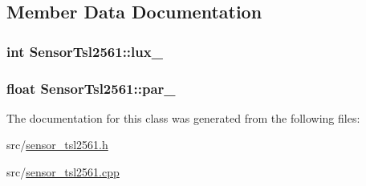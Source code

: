 \subsection{Member Data Documentation}
\hypertarget{class_sensor_tsl2561_ae12c0a6210834b63eb786e81043c38c4}{}
\subsubsection[{lux\+\_\+}]{\setlength{\rightskip}{0pt plus 5cm}int Sensor\+Tsl2561\+::lux\+\_\+}\label{class_sensor_tsl2561_ae12c0a6210834b63eb786e81043c38c4}
\hypertarget{class_sensor_tsl2561_a1159f0229bf7cfc07da35366f81661f7}{}
\subsubsection[{par\+\_\+}]{\setlength{\rightskip}{0pt plus 5cm}float Sensor\+Tsl2561\+::par\+\_\+}\label{class_sensor_tsl2561_a1159f0229bf7cfc07da35366f81661f7}


The documentation for this class was generated from the following files\+:\begin{DoxyCompactItemize}
\item 
src/\hyperlink{sensor__tsl2561_8h}{sensor\+\_\+tsl2561.\+h}\item 
src/\hyperlink{sensor__tsl2561_8cpp}{sensor\+\_\+tsl2561.\+cpp}\end{DoxyCompactItemize}
